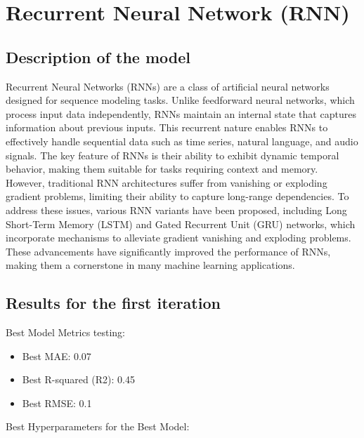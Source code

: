 \documentclass[10pt]{article} %
\begin{document}
    \section{Recurrent Neural Network (RNN)}
    \subsection{Description of the model}
    Recurrent Neural Networks (RNNs) are a class of artificial neural networks designed for sequence modeling tasks. Unlike feedforward neural networks, which process input data independently, RNNs maintain an internal state that captures information about previous inputs. This recurrent nature enables RNNs to effectively handle sequential data such as time series, natural language, and audio signals. The key feature of RNNs is their ability to exhibit dynamic temporal behavior, making them suitable for tasks requiring context and memory. However, traditional RNN architectures suffer from vanishing or exploding gradient problems, limiting their ability to capture long-range dependencies. To address these issues, various RNN variants have been proposed, including Long Short-Term Memory (LSTM) and Gated Recurrent Unit (GRU) networks, which incorporate mechanisms to alleviate gradient vanishing and exploding problems. These advancements have significantly improved the performance of RNNs, making them a cornerstone in many machine learning applications.

    \subsection{Results for the first iteration}

    Best Model Metrics testing:
    \begin{itemize}
        \item     Best MAE: 0.07
        \item Best R-squared (R2): 0.45 
        \item Best RMSE: 0.1
    \end{itemize}

Best Hyperparameters for the Best Model:
\end{document}
